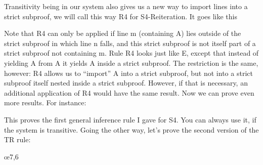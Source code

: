 Transitivity being in our system also gives us a new way to import lines into a strict subproof, we will call this way R4 for S4-Reiteration. It goes like this

Note that R4 can only be applied if line m (containing \ebox A) lies outside of the strict subproof in which line n falls, and this strict subproof is not itself part of a strict subproof not containing m. Rule R4 looks just like \ebox E, except that instead of yielding A from \ebox A it yields \ebox A inside a strict subproof. The restriction is the same, however: R4 allows us to “import” \ebox A into a strict subproof, but not into a strict subproof itself nested inside a strict subproof. However, if that is necessary, an additional application of R4 would have the same result. Now we can prove even more results. For instance:
\begin{fitchproof}
\open
{}
\open
{} 
\close
{}
\close
{}	
\end{fitchproof}

This proves the first general inference rule I gave for S4. You can always use it, if the system is transitive. Going the other way, let's prove the second version of the TR rule:
\begin{fitchproof}
\open
{}
\open
{}
\open
{}
\oe{7,6}
\close
{}
\close
{}
\close
{}
\end{fitchproof}

